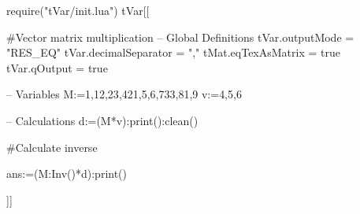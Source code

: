 \documentclass{article}
\begin{document}
\begin{luacode}
require("tVar/init.lua")
tVar[[

#Vector matrix multiplication
-- Global Definitions
tVar.outputMode = "RES_EQ"
tVar.decimalSeparator = ","
tMat.eqTexAsMatrix = true
tVar.qOutput = true

-- Variables
M:={{1,12,23},{421,5,6},{733,81,9}}
v:={4,5,6}

-- Calculations
d:=(M*v):print():clean()

#Calculate inverse

ans:=(M:Inv()*d):print()

]]	
\end{luacode}
\end{document}
